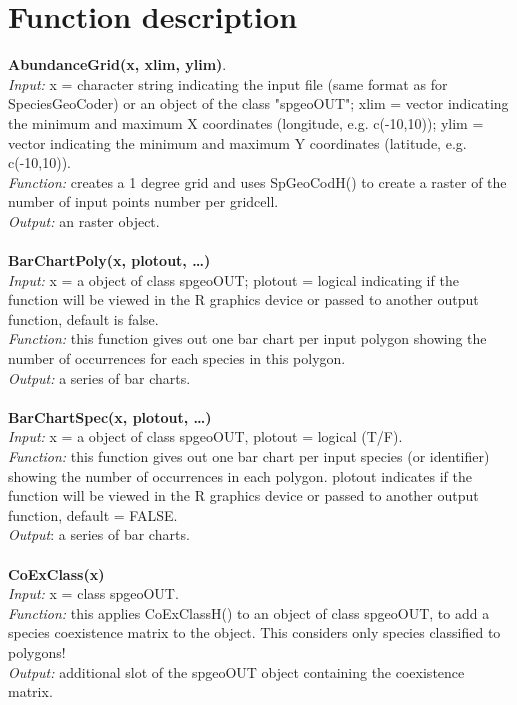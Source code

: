 \documentclass[a4paper,titlepage,11pt]{scrreprt}
\begin{document}
\chapter{Function description} \label{functions}
\textbf{AbundanceGrid(x, xlim, ylim)}.\\
\textit{Input:} x = character string indicating the input file (same format as for SpeciesGeoCoder) or an object of the class "spgeoOUT"; xlim = vector indicating the minimum and maximum X coordinates (longitude, e.g. c(-10,10)); ylim = vector indicating the minimum and maximum Y coordinates (latitude, e.g. c(-10,10)).\\
\textit{Function:} creates a 1 degree grid and uses SpGeoCodH() to create a raster of the number of input points number per gridcell.\\
\textit{Output:} an raster object.\\
\\
\textbf{BarChartPoly(x, plotout, \dots)}\\
\textit{Input:} x = a object of class spgeoOUT; plotout = logical indicating if the function will be viewed in the R graphics device or passed to another output function, default is false.\\
\textit{Function:} this function gives out one bar chart per input polygon showing the number of occurrences for each species in this polygon.\\
\textit{Output:} a series of bar charts.\\
\\
\textbf{BarChartSpec(x, plotout,  \dots)}\\
\textit{Input:} x = a object of class spgeoOUT, plotout = logical (T/F).\\
\textit{Function:} this function gives out one bar chart per input species (or identifier) showing the number of occurrences in each polygon. plotout indicates if the function will be viewed in the R graphics device or passed to another output function, default = FALSE.\\
\textit{Output}: a series of bar charts.\\
\\
\textbf{CoExClass(x)}\\
\textit{Input:} x = class spgeoOUT.\\
\textit{Function:} this applies CoExClassH() to an object of class spgeoOUT, to add a species coexistence matrix to the object. This considers only species classified to polygons!\\
\textit{Output:} additional slot of the spgeoOUT object containing the coexistence matrix.\\
\end{document}
